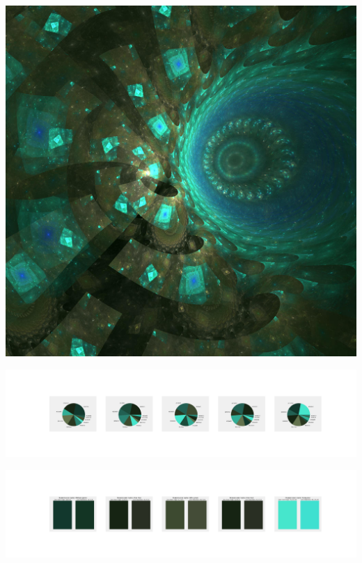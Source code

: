 \documentclass[11pt]{article}
\begin{document}
\begin{landscape}
    \begin{center}
    \includegraphics[width=\textwidth]{./nbimg/file (239).jpg}
    \end{center}

    \begin{center}
    \includegraphics[width=250mm]{./nbimg/pie-155.jpg}
    \end{center}

    \begin{center}
    \includegraphics[width=250mm]{./nbimg/peak-155.jpg}
    \end{center}
    


\end{landscape}
\end{document}
